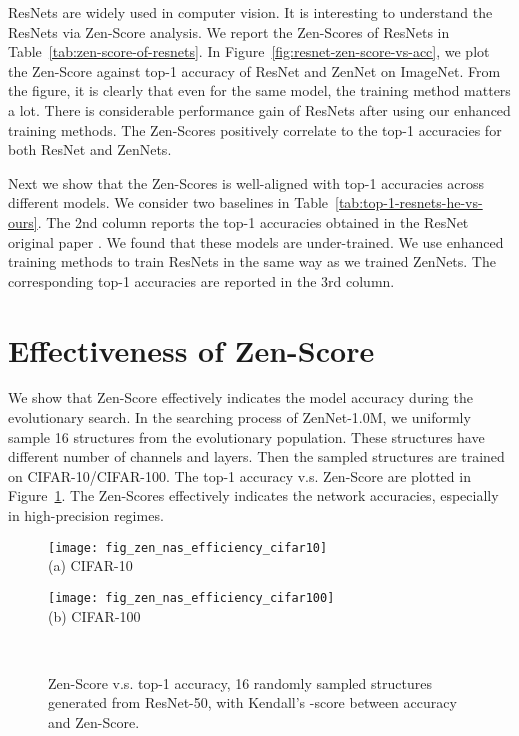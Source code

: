 \documentclass{article}
\providecommand{\citep}{\cite}
\begin{document}
ResNets are widely used in computer vision. It is interesting to understand the ResNets via Zen-Score analysis. We report the Zen-Scores of ResNets in Table~\ref{tab:zen-score-of-resnets}. In Figure~\ref{fig:resnet-zen-score-vs-acc}, we plot the Zen-Score against top-1 accuracy of ResNet and ZenNet on ImageNet. From the figure, it is clearly that even for the same model, the training method matters a lot. There is considerable performance gain of ResNets after using our enhanced training methods. The Zen-Scores positively correlate to the top-1 accuracies for both ResNet and ZenNets. 


Next we show that the Zen-Scores is well-aligned with top-1 accuracies across different models. We consider two baselines in Table~\ref{tab:top-1-resnets-he-vs-ours}. The 2nd column reports the top-1 accuracies obtained in the ResNet original paper \citep{heDeepResidualLearning2016}. We found that these models are under-trained. We use enhanced training methods to train ResNets in the same way as we trained ZenNets. The corresponding top-1 accuracies are reported in the 3rd column.




\section{Effectiveness of Zen-Score}
\label{sec:Effectiveness-of-Zen-Score}

We show that Zen-Score effectively indicates the model accuracy during the evolutionary search. In the searching process of ZenNet-1.0M, we uniformly sample 16 structures from the evolutionary population. These structures have different number of channels and layers. Then the sampled structures are trained on CIFAR-10/CIFAR-100. The top-1 accuracy v.s. Zen-Score are plotted in Figure~\ref{fig:zen-score-vs-acc}. The Zen-Scores effectively indicates the network accuracies, especially in high-precision regimes.

\begin{figure}[!]
 \begin{minipage}{0.48\linewidth}
   \begin{center}
     \texttt{[image: fig\_zen\_nas\_efficiency\_cifar10]}\\
     (a) CIFAR-10
   \end{center}
 \end{minipage}
 \hfil  
 \begin{minipage}{0.48\linewidth}
   \begin{center}
     \texttt{[image: fig\_zen\_nas\_efficiency\_cifar100]}\\
     (b) CIFAR-100
   \end{center}
 \end{minipage}\\
 \caption{Zen-Score v.s. top-1 accuracy, 16 randomly sampled structures generated from ResNet-50, with Kendall's -score between accuracy and Zen-Score.}
 \label{fig:zen-score-vs-acc}
\end{figure}
\end{document}
